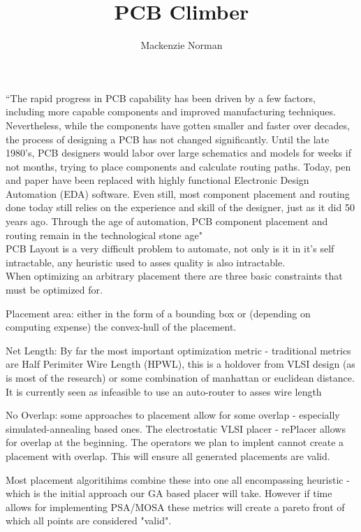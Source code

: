 \documentclass{article}
\title{PCB Climber}
\author{Mackenzie Norman}
\begin{document}
\maketitle


``The rapid progress in PCB capability has been driven by a few factors, including more capable components and improved manufacturing techniques. Nevertheless, while the components have gotten smaller and faster over decades, the process of designing a PCB has not changed significantly. Until the late 1980’s, PCB designers would labor over large schematics and models for weeks if not months, trying to place components and calculate routing paths. Today, pen and paper have been replaced with highly functional Electronic Design Automation (EDA) software. Even still, most component placement and routing done today still relies on the experience and skill of the designer, just as it did 50 years ago. Through the age of automation, PCB component placement and routing remain in the technological stone age" \\

PCB Layout is a very difficult problem to automate, not only is it in it's self intractable, any heuristic used to asses quality is also intractable.\\

When optimizing an arbitrary placement there are three basic constraints that must be optimized for.

Placement area: either in the form of a bounding box or (depending on computing expense) the convex-hull of the placement. 

Net Length: By far the most important optimization metric - traditional metrics are Half Perimiter Wire Length (HPWL), this is a holdover from VLSI design (as is most of the research) or some combination of manhattan or euclidean distance. It is currently seen as infeasible to use an auto-router to asses wire length

No Overlap: some approaches to placement allow for some overlap - especially simulated-annealing based ones. The electrostatic VLSI placer - rePlacer allows for overlap at the beginning. The operators we plan to implent cannot create a placement with overlap. This will ensure all generated placements are valid. 

Most placement algoritihims combine these into one all encompassing heuristic - which is the initial approach our GA based placer will take. However if time allows for implementing PSA/MOSA these metrics will create a pareto front of which all points are considered "valid". 
\end{document}
